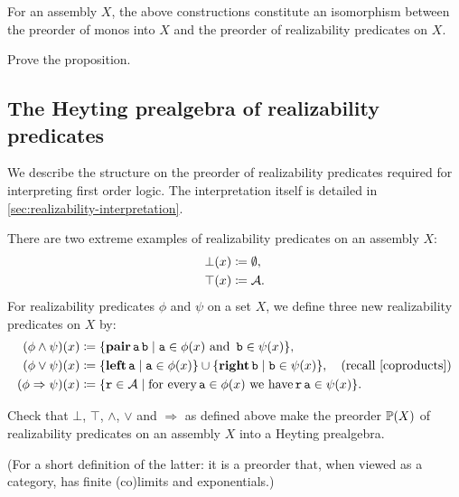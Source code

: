 \begin{proposition}\label{preorders-mono-predicates-iso}
  For an assembly \(X\), the above constructions constitute an isomorphism
  between the preorder of monos into \(X\) and the preorder of
  realizability predicates on \(X\).
\end{proposition}
\begin{exercise}\label{exer:preorders-monos-predicates-iso}
  Prove the proposition.
\end{exercise}


\subsection{The Heyting prealgebra of realizability predicates}%
\label{sec:Heyting-prealgebra-realizability-predicates}

We describe the structure on the preorder of realizability
predicates required for interpreting first order logic.
%
The interpretation itself is detailed in
\cref{sec:realizability-interpretation}.

\begin{definition}
  There are two extreme examples of realizability predicates on an assembly \(X\):
  \begin{align*}
    \bot(x) &\coloneqq \emptyset, \\
    \top(x) &\coloneqq \AA.
  \end{align*}
  For realizability predicates \(\phi\) and \(\psi\) on a set \(X\), we define
  three new realizability predicates on \(X\) by:
  \begin{align*}
    (\phi \land \psi)(x) &\coloneqq \set{\pcapair\pca{a}\pca{b} \mid
      \pca{a} \in \phi(x) \text{ and } \pca{b} \in \psi(x)}, \\
    (\phi \lor \psi)(x) &\coloneqq
    \set{\pcaleft\pca{a} \mid \pca{a} \in \phi(x)} \cup
    \set{\pcaright\pca{b} \mid \pca{b} \in \psi(x)},
                          \quad(\text{recall~\cref{coproducts}}) \\
    (\phi \Rightarrow \psi)(x) &\coloneqq
    \set{\pca{r} \in \AA \mid \text{for every}
    \pca{a} \in \phi(x) \text{ we have} \pca{r}\pca{a} \in \psi(x)}.
  \end{align*}
\end{definition}

\begin{exercise}\label{exer:predicates-heyting-prealgebra}
  Check that \(\bot\), \(\top\), \(\land\), \(\lor\) and \(\Rightarrow\) as
  defined above make the preorder \(\realpred(X)\) of realizability predicates
  on an assembly \(X\) into a Heyting prealgebra.

  (For a short definition of the latter: it is a preorder that, when viewed as a
  category, has finite (co)limits and exponentials.)
\end{exercise}

